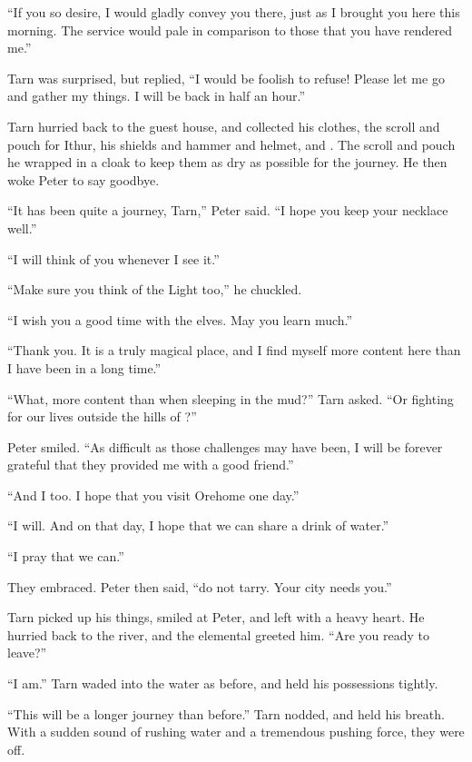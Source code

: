 ``If you so desire, I would gladly convey you there, just as I brought you here this morning.  The service would pale in comparison to those that you have rendered me.''

Tarn was surprised, but replied, ``I would be foolish to refuse!  Please let me go and gather my things.  I will be back in half an hour.''

Tarn hurried back to the guest house, and collected his clothes, the scroll and pouch for Ithur, his shields and hammer and helmet, and \kildir.  The scroll and pouch he wrapped in a cloak to keep them as dry as possible for the journey.  He then woke Peter to say goodbye.

``It has been quite a journey, Tarn,'' Peter said.  ``I hope you keep your necklace well.''

``I will think of you whenever I see it.''

``Make sure you think of the Light too,'' he chuckled.

``I wish you a good time with the elves.  May you learn much.''

``Thank you. It is a truly magical place, and I find myself more content here than I have been in a long time.''

``What, more content than when sleeping in the mud?'' Tarn asked.  ``Or fighting for our lives outside the hills of \tholkunrond?''

Peter smiled.  ``As difficult as those challenges may have been, I will be forever grateful that they provided me with a good friend.''

``And I too.  I hope that you visit Orehome one day.''

``I will.  And on that day, I hope that we can share a drink of water.''

``I pray that we can.''

They embraced.  Peter then said, ``do not tarry.  Your city needs you.''

Tarn picked up his things, smiled at Peter, and left with a heavy heart.  He hurried back to the river, and the elemental greeted him.  ``Are you ready to leave?''

``I am.''  Tarn waded into the water as before, and held his possessions tightly.

``This will be a longer journey than before.''  Tarn nodded, and held his breath.  With a sudden sound of rushing water and a tremendous pushing force, they were off.

